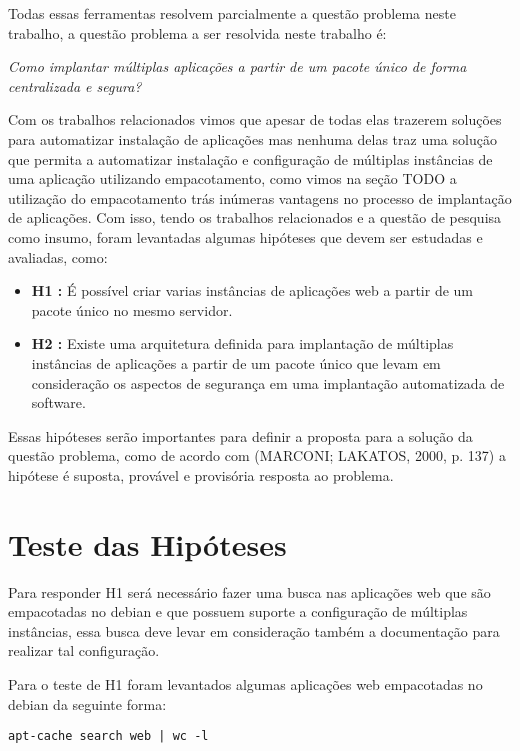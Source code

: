 Todas essas ferramentas resolvem parcialmente a questão problema neste trabalho,
a questão problema a ser resolvida neste trabalho é:

\begin{center}
  \textit{
  Como implantar múltiplas aplicações a partir de um pacote único
  de forma centralizada e segura?
}
\end{center}

Com os trabalhos relacionados vimos que apesar de todas elas trazerem soluções
para automatizar instalação de aplicações mas nenhuma delas traz uma solução que
permita a automatizar instalação e configuração de múltiplas instâncias de uma aplicação
utilizando empacotamento, como vimos na seção TODO a utilização do empacotamento
trás inúmeras vantagens no processo de implantação de aplicações. Com isso, tendo
os trabalhos relacionados e a questão de pesquisa como insumo,
foram levantadas algumas hipóteses que devem ser estudadas e avaliadas, como:

\begin{itemize}
  \item  \textbf{H1 :} É possível criar varias instâncias de aplicações
  web a partir de um pacote único no mesmo servidor.
   \item  \textbf{H2 :} Existe uma arquitetura definida para implantação de
   múltiplas instâncias de aplicações a partir de um pacote único que levam em consideração
   os aspectos de segurança em uma implantação automatizada de software.
\end{itemize}

Essas hipóteses serão importantes para definir a proposta para a solução da questão
problema, como de acordo com (MARCONI; LAKATOS, 2000, p. 137) a hipótese
é suposta, provável e provisória resposta ao problema.

\section{Teste das Hipóteses}

Para responder H1 será necessário fazer uma busca nas aplicações web que são
empacotadas no debian e que possuem suporte a configuração de múltiplas instâncias,
essa busca deve levar em consideração também a documentação para realizar tal
configuração.

Para o teste de H1 foram levantados algumas aplicações web empacotadas no debian
da seguinte forma:

\begin{verbatim}
apt-cache search web | wc -l
\end{verbatim}

